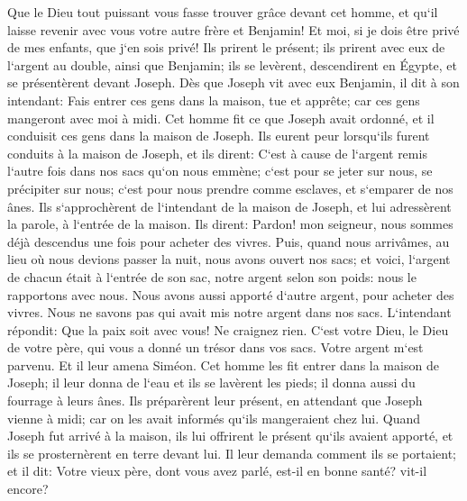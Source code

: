\verse Que le Dieu tout puissant vous fasse trouver grâce devant cet homme, et qu`il laisse revenir avec vous votre autre frère et Benjamin! Et moi, si je dois être privé de mes enfants, que j`en sois privé! 
\verse Ils prirent le présent; ils prirent avec eux de l`argent au double, ainsi que Benjamin; ils se levèrent, descendirent en Égypte, et se présentèrent devant Joseph. 
\verse Dès que Joseph vit avec eux Benjamin, il dit à son intendant: Fais entrer ces gens dans la maison, tue et apprête; car ces gens mangeront avec moi à midi. 
\verse Cet homme fit ce que Joseph avait ordonné, et il conduisit ces gens dans la maison de Joseph. 
\verse Ils eurent peur lorsqu`ils furent conduits à la maison de Joseph, et ils dirent: C`est à cause de l`argent remis l`autre fois dans nos sacs qu`on nous emmène; c`est pour se jeter sur nous, se précipiter sur nous; c`est pour nous prendre comme esclaves, et s`emparer de nos ânes. 
\verse Ils s`approchèrent de l`intendant de la maison de Joseph, et lui adressèrent la parole, à l`entrée de la maison. 
\verse Ils dirent: Pardon! mon seigneur, nous sommes déjà descendus une fois pour acheter des vivres. 
\verse Puis, quand nous arrivâmes, au lieu où nous devions passer la nuit, nous avons ouvert nos sacs; et voici, l`argent de chacun était à l`entrée de son sac, notre argent selon son poids: nous le rapportons avec nous. 
\verse Nous avons aussi apporté d`autre argent, pour acheter des vivres. Nous ne savons pas qui avait mis notre argent dans nos sacs. 
\verse L`intendant répondit: Que la paix soit avec vous! Ne craignez rien. C`est votre Dieu, le Dieu de votre père, qui vous a donné un trésor dans vos sacs. Votre argent m`est parvenu. Et il leur amena Siméon. 
\verse Cet homme les fit entrer dans la maison de Joseph; il leur donna de l`eau et ils se lavèrent les pieds; il donna aussi du fourrage à leurs ânes. 
\verse Ils préparèrent leur présent, en attendant que Joseph vienne à midi; car on les avait informés qu`ils mangeraient chez lui. 
\verse Quand Joseph fut arrivé à la maison, ils lui offrirent le présent qu`ils avaient apporté, et ils se prosternèrent en terre devant lui. 
\verse Il leur demanda comment ils se portaient; et il dit: Votre vieux père, dont vous avez parlé, est-il en bonne santé? vit-il encore? 
